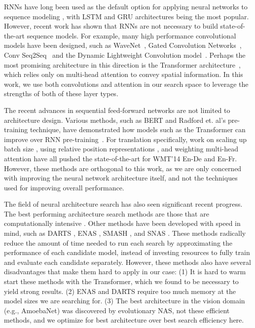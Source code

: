 \documentclass{article}
\begin{document}
RNNs have long been used as the default option for applying neural networks to sequence modeling \cite{sutskever14,bahdanau2015}, with LSTM \cite{hochreiter97} and GRU \cite{cho14} architectures being the most popular. However, recent work has shown that RNNs are not necessary to build state-of-the-art sequence models. For example, many high performance convolutional models have been designed, such as WaveNet~\cite{van2016wavenet}, Gated Convolution Networks~\cite{dauphin2017language}, Conv Seq2Seq~\cite{gehring2017} and the Dynamic Lightweight Convolution model~\cite{wu2018pay}. Perhaps the most promising architecture in this direction is the Transformer architecture~\cite{vaswani17}, which relies only on multi-head attention to convey spatial information. In this work, we use both convolutions and attention in our search space to leverage the strengths of both of these layer types. 

The recent advances in sequential feed-forward networks are not limited to architecture design. Various methods, such as BERT \cite{devlin18} and Radford et. al's  pre-training technique, have demonstrated how models such as the Transformer can improve over RNN pre-training~\cite{dai2015semi,Peters:2018}.
For translation specifically, work on scaling up batch size \cite{ott18, wu2018pay}, using relative position representations \cite{shaw18}, and weighting multi-head attention \cite{ahmed17} have all pushed the state-of-the-art for WMT'14 En-De and En-Fr. However, these methods are orthogonal to this work, as we are only concerned with improving the neural network architecture itself, and not the techniques used for improving overall performance.

The field of neural architecture search has also seen significant recent progress. The best performing architecture search methods are those that are computationally intensive \cite{zoph16, baker2016designing, real17, Xie2017GeneticC, zoph18, real19}. Other methods have been developed with speed in mind, such as DARTS \cite{hliu18}, ENAS \cite{pham18}, SMASH \cite{brock2018smash}, and SNAS \cite{xie19}. These methods radically reduce the amount of time needed to run each search by approximating the performance of each candidate model, instead of investing resources to fully train and evaluate each candidate separately. However, these methods also have several disadvantages that make them hard to apply in our case: (1) It is hard to warm start these methods with the Transformer, which we found to be necessary to yield strong results. (2) ENAS and DARTS require too much memory at the model sizes we are searching for. (3) The best architecture in the vision domain (e.g., AmoebaNet\cite{real19}) was discovered by evolutionary NAS, not these efficient methods, and we optimize for best architecture over best search efficiency here.
\end{document}
